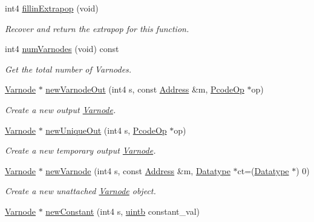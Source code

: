 \begin{DoxyCompactItemize}
int4 \mbox{\hyperlink{class_funcdata_a142938fffbfd5add2b6679a6b9b0d7fa}{fillin\+Extrapop}} (void)
\begin{DoxyCompactList}\small\item\em Recover and return the {\itshape extrapop} for this function. \end{DoxyCompactList}\item 
int4 \mbox{\hyperlink{class_funcdata_a4a3390320b74e47d309f27fe6fd1d7e4}{num\+Varnodes}} (void) const
\begin{DoxyCompactList}\small\item\em Get the total number of Varnodes. \end{DoxyCompactList}\item 
\mbox{\hyperlink{class_varnode}{Varnode}} $\ast$ \mbox{\hyperlink{class_funcdata_a100e6704e4c245e076170268d31b47ec}{new\+Varnode\+Out}} (int4 s, const \mbox{\hyperlink{class_address}{Address}} \&m, \mbox{\hyperlink{class_pcode_op}{Pcode\+Op}} $\ast$op)
\begin{DoxyCompactList}\small\item\em Create a new output \mbox{\hyperlink{class_varnode}{Varnode}}. \end{DoxyCompactList}\item 
\mbox{\hyperlink{class_varnode}{Varnode}} $\ast$ \mbox{\hyperlink{class_funcdata_af189a9a5b390332c6e87c8faa334cd68}{new\+Unique\+Out}} (int4 s, \mbox{\hyperlink{class_pcode_op}{Pcode\+Op}} $\ast$op)
\begin{DoxyCompactList}\small\item\em Create a new {\itshape temporary} output \mbox{\hyperlink{class_varnode}{Varnode}}. \end{DoxyCompactList}\item 
\mbox{\hyperlink{class_varnode}{Varnode}} $\ast$ \mbox{\hyperlink{class_funcdata_a22894e1c7b0f30a5391993924cd96d3d}{new\+Varnode}} (int4 s, const \mbox{\hyperlink{class_address}{Address}} \&m, \mbox{\hyperlink{class_datatype}{Datatype}} $\ast$ct=(\mbox{\hyperlink{class_datatype}{Datatype}} $\ast$) 0)
\begin{DoxyCompactList}\small\item\em Create a new unattached \mbox{\hyperlink{class_varnode}{Varnode}} object. \end{DoxyCompactList}\item 
\mbox{\hyperlink{class_varnode}{Varnode}} $\ast$ \mbox{\hyperlink{class_funcdata_af58542dbcc89f4b84ffc8834b023125b}{new\+Constant}} (int4 s, \mbox{\hyperlink{types_8h_a2db313c5d32a12b01d26ac9b3bca178f}{uintb}} constant\+\_\+val)

\end{DoxyCompactItemize}
